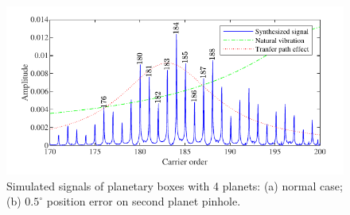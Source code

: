 \documentclass[a4paper,fleqn]{cas-sc}%
\begin{document}
\begin{figure}[pos=htbp]
    \hspace*{1.5em}\includegraphics[scale=\myscale,valign=t]{Freq_p4_fault.pdf}
    \caption{Simulated signals of planetary boxes with 4 planets: (a) normal case; (b) $0.5^\circ$ position error on second planet pinhole.}
    \label{fig:simulated_p4}
\end{figure}
\end{document}

